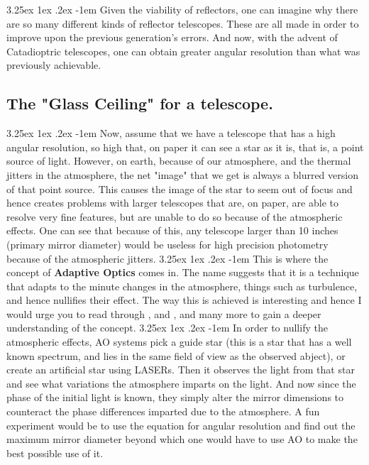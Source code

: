 \documentclass[a4paper,twoside,11pt]{article}
\makeatletter
\numberwithin{equation}{section}
\renewcommand\paragraph{\@startsection{paragraph}{5}{\z@}%
  {3.25ex \@plus1ex \@minus.2ex}%
  {-1em}%
  {\normalfont\normalsize\bfseries}}
\makeatother
\begin{document}
\paragraph{}
Given the viability of reflectors, one can imagine why there are so many different kinds of reflector telescopes. These are all made in order to improve upon the previous generation's errors. And now, with the advent of Catadioptric telescopes, one can obtain greater angular resolution than what was previously achievable. 

\subsection{The "Glass Ceiling" for a telescope.}
\paragraph{}
Now, assume that we have a telescope that has a high angular resolution, so high that, on paper it can see a star as it is, that is, a point source of light. However, on earth, because of our atmosphere, and the thermal jitters in the atmosphere, the net "image" that we get is always a blurred version of that point source. This causes the image of the star to seem out of focus and hence creates problems with larger telescopes that are, on paper, are able to resolve very fine features, but are unable to do so because of the atmospheric effects. One can see that because of this, any telescope larger than 10 inches (primary mirror diameter) would be useless for high precision photometry because of the atmospheric jitters.
\paragraph{}
This is where the concept of \textbf{Adaptive Optics} comes in. The name suggests that it is a technique that adapts to the minute changes in the atmosphere, things such as turbulence, and hence nullifies their effect. The way this is achieved is interesting and hence I would urge you to read through \cite{AO1}, \cite{AO2} and \cite{AO3}, and many more to gain a deeper understanding of the concept. 
\paragraph{}
In order to nullify the atmospheric effects, AO systems pick a guide star (this is a star that has a well known spectrum, and lies in the same field of view as the observed abject), or create an artificial star using LASERs. Then it observes the light from that star and see what variations the atmosphere imparts on the light. And now since the phase of the initial light is known, they simply alter the mirror dimensions to counteract the phase differences imparted due to the atmosphere. A fun experiment would be to use the equation for angular resolution and find out the maximum mirror diameter beyond which one would have to use AO to make the best possible use of it.
\end{document}
